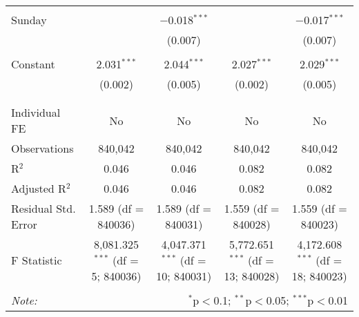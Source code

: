 \documentclass[
]{article}
\begin{document}
\begin{table}[!htbp]
{\begin{tabular}{@{\extracolsep{5pt}}lcccc}
  & & & & \\ 
 Sunday &  & $-$0.018$^{***}$ &  & $-$0.017$^{***}$ \\ 
  &  & (0.007) &  & (0.007) \\ 
  & & & & \\ 
 Constant & 2.031$^{***}$ & 2.044$^{***}$ & 2.027$^{***}$ & 2.029$^{***}$ \\ 
  & (0.002) & (0.005) & (0.002) & (0.005) \\ 
  & & & & \\ 
\hline \\[-1.8ex] 
Individual FE & No & No & No & No \\ 
Observations & 840,042 & 840,042 & 840,042 & 840,042 \\ 
R$^{2}$ & 0.046 & 0.046 & 0.082 & 0.082 \\ 
Adjusted R$^{2}$ & 0.046 & 0.046 & 0.082 & 0.082 \\ 
Residual Std. Error & 1.589 (df = 840036) & 1.589 (df = 840031) & 1.559 (df = 840028) & 1.559 (df = 840023) \\ 
F Statistic & 8,081.325$^{***}$ (df = 5; 840036) & 4,047.371$^{***}$ (df = 10; 840031) & 5,772.651$^{***}$ (df = 13; 840028) & 4,172.608$^{***}$ (df = 18; 840023) \\ 
\hline 
\hline \\[-1.8ex] 
\textit{Note:}  & \multicolumn{4}{r}{$^{*}$p$<$0.1; $^{**}$p$<$0.05; $^{***}$p$<$0.01} \\ 
\end{tabular}
} 
\end{table} 
\newpage
\end{document}
